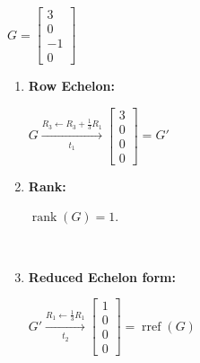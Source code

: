 $G=
\begin{bmatrix}
    3 \\
    0 \\
   -1 \\
    0
\end{bmatrix}
$ \\[1.0em]

\begin{enumerate}
    \item
    \textbf{Row Echelon:} \\[1.0em]
    \begin{answer}
        $G \xrightarrow[t_1]{R_3 \leftarrow R_3+\frac{1}{3}R_1}
        \begin{bmatrix}
            3 \\
            0 \\
            0 \\
            0
        \end{bmatrix}
        = G'$
    \end{answer}

    \item
    \textbf{Rank:}
    \begin{answer}
        $\operatorname{rank}(G)=1.$
    \end{answer} \\

    \item
    \textbf{Reduced Echelon form:} \\[1.0em]
    \begin{answer}
        $G' \xrightarrow[t_2]{R_1 \leftarrow \frac{1}{3}R_1}
        \begin{bmatrix}
            1 \\
            0 \\
            0 \\
            0
        \end{bmatrix}
        = \operatorname{rref}(G)$
    \end{answer}
\end{enumerate}

